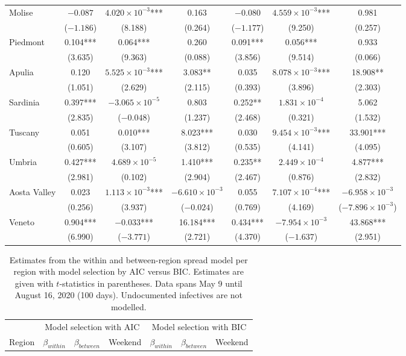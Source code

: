 \documentclass[12pt]{article}
\begin{document}
\begin{appendices}
\begin{longtable}{@{}lcccccc@{}}
            Molise & $-0.087$ & $4.020 \times 10^{-3}$*** & 0.163 & $-0.080$ & $4.559 \times 10^{-3}$*** & 0.981 \\ 
             & ($-1.186$) & (8.188) & (0.264) & ($-1.177$) & (9.250) & (0.257) \\ 
            Piedmont & 0.104*** & 0.064*** & 0.260 & 0.091*** & 0.056*** & 0.933 \\ 
             & (3.635) & (9.363) & (0.088) & (3.856) & (9.514) & (0.066) \\ 
            Apulia & 0.120 & $5.525 \times 10^{-3}$*** & 3.083** & 0.035 & $8.078 \times 10^{-3}$*** & 18.908** \\ 
             & (1.051) & (2.629) & (2.115) & (0.393) & (3.896) & (2.303) \\ 
            Sardinia & 0.397*** & $-3.065 \times 10^{-5}$ & 0.803 & 0.252** & $1.831 \times 10^{-4}$ & 5.062 \\ 
             & (2.835) & ($-0.048$) & (1.237) & (2.468) & (0.321) & (1.532) \\ 
            Tuscany & 0.051 & 0.010*** & 8.023*** & 0.030 & $9.454 \times 10^{-3}$*** & 33.901*** \\ 
             & (0.605) & (3.107) & (3.812) & (0.535) & (4.141) & (4.095) \\ 
            Umbria & 0.427*** & $4.689 \times 10^{-5}$ & 1.410*** & 0.235** & $2.449 \times 10^{-4}$ & 4.877*** \\ 
             & (2.981) & (0.102) & (2.904) & (2.467) & (0.876) & (2.832) \\ 
            Aosta Valley & 0.023 & $1.113 \times 10^{-3}$*** & $-6.610 \times 10^{-3}$ & 0.055 & $7.107 \times 10^{-4}$*** & $-6.958 \times 10^{-3}$ \\ 
             & (0.256) & (3.937) & ($-0.024$) & (0.769) & (4.169) & ($-7.896 \times 10^{-3}$) \\ 
            Veneto & 0.904*** & $-0.033$*** & 16.184*** & 0.434*** & $-7.954 \times 10^{-3}$ & 43.868*** \\ 
             & (6.990) & ($-3.771$) & (2.721) & (4.370) & ($-1.637$) & (2.951) \\* \bottomrule
    	\end{longtable}
		
		\begin{longtable}{@{}lcccccc@{}}
    		\caption{Estimates from the within and between-region spread model per region with model selection by AIC versus BIC. Estimates are given with $t$-statistics in parentheses. Data spans May 9 until August 16, 2020 (100 days). Undocumented infectives are not modelled.}
    		\label{tab:results_between_aic_vs_bic}\\
    		\toprule
    		                & \multicolumn{3}{c}{Model selection with AIC} & \multicolumn{3}{c}{Model selection with BIC} \\
    		                \cmidrule(lr){2-4}
                            \cmidrule(lr){5-7}
    		Region          & $\beta_{within}$ & $\beta_{between}$ & Weekend & $\beta_{within}$ & $\beta_{between}$ & Weekend \\* \midrule
    		\endfirsthead
    		

\end{longtable}
\end{appendices}
\end{document}

